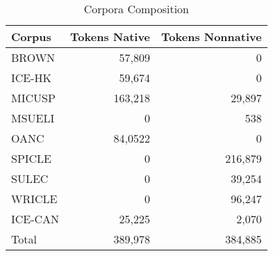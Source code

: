 \documentclass[main.tex]{subfiles}
\begin{document}
\begin{table}[htbp]
\small
\centering
\caption{Corpora Composition}
  \begin{tabular}{  l  r  r }
  \toprule
    Corpus & Tokens Native & Tokens Nonnative \\ \midrule
    BROWN & 57,809 & 0 \\
    ICE-HK & 59,674 & 0 \\
    MICUSP & 163,218  & 29,897 \\
    MSUELI & 0 & 538 \\
    OANC & 84,0522 & 0 \\
    SPICLE & 0 & 216,879 \\
    SULEC & 0 & 39,254 \\
    WRICLE & 0 & 96,247  \\
    ICE-CAN & 25,225 & 2,070 \\
    \midrule
    Total & 389,978 & 384,885  \\
    \bottomrule
  \end{tabular}
\label{table:corpora}
\end{table}


\biblio
\end{document}
